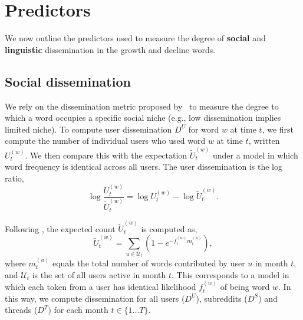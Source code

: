 \section{Predictors}

We now outline the predictors used to measure the degree of \textbf{social} and \textbf{linguistic} dissemination in the growth and decline words.

\subsection{Social dissemination}

We rely on the dissemination metric proposed by~ to measure the degree to which a word occupies a specific social niche (e.g., low dissemination implies limited niche).
To compute user dissemination $D^U$ for word $w$ at time $t$, we first compute the number of individual users who used word $w$ at time $t$, written $U^{(w)}_t$. 
We then compare this with the expectation $\tilde{U}^{(w)}_t$ under a model in which word frequency is identical across all users.
The user dissemination is the log ratio,
\begin{equation}
\log \frac{U_{t}^{(w)}}{\tilde{U}_{t}^{(w)}} = \log U^{(w)}_{t} - \log \tilde{U}^{(w)}_{t}.
\end{equation}

Following , the expected count $\tilde{U}_t^{(w)}$ is computed as,
\begin{equation}
\tilde{U}_{t}^{(w)} = \sum_{u \in \mathcal{U}_{t}}(1 - e^{-f_{t}^{(w)}m_{t}^{(u)}}),
\end{equation}
where $m_{t}^{(u)}$ equals the total number of words contributed by user $u$ in month $t$, and $\mathcal{U}_{t}$ is the set of all users active in month $t$. 
This corresponds to a model in which each token from a user has identical likelihood $f_t^{(w)}$ of being word $w$.
In this way, we compute dissemination for all users ($D^{U}$), subreddits ($D^{S}$) and threads ($D^{T}$) for each month $t \in \{1 ... T\}$.

